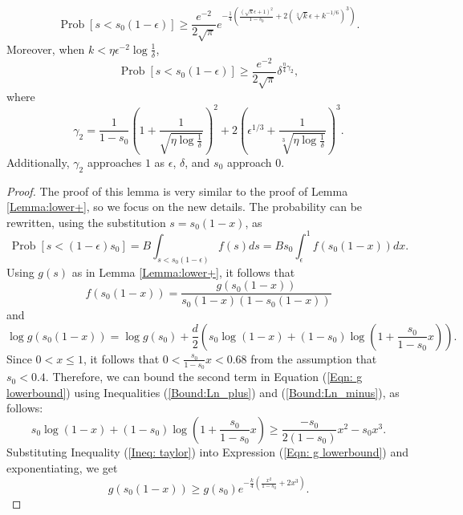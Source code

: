 \documentclass[twoside,11pt]{article}
\newcommand{\pP}[1]{\operatorname{Prob}\left[ #1 \right] }
\begin{document}
\begin{lemma} 
\[ \pP{s<s_0(1-\epsilon)} \geq \frac{e^{-2}}{2\sqrt{\pi}} e^{	- \frac{1}{4}\left(\frac{(\sqrt{k} \epsilon + 1)^2}{1-s_0} + 2(\sqrt[3]{k} \epsilon + k^{-1/6})^3\right)}.\]
Moreover, when $k<\eta\epsilon^{-2}\log\frac{1}{\delta}$,
$$
\pP{s<s_0(1-\epsilon)} \geq \frac{e^{-2}}{2\sqrt{\pi}} \delta^{\frac{\eta}{4}\gamma_2},$$
where
$$
\gamma_2=\frac{1}{1-s_0}\left(1+\frac{1}{\sqrt{\eta\log\frac{1}{\delta}}}\right)^2+2\left(\epsilon^{1/3}+\frac{1}{\sqrt[3]{\eta\log\frac{1}{\delta}}}\right)^3.
$$
Additionally, $\gamma_2$ approaches $1$ as $\epsilon$, $\delta$, and $s_0$ approach $0$.
\end{lemma}
				
\begin{proof}
The proof of this lemma is very similar to the proof of Lemma \ref{Lemma:lower+}, so we focus on the new details.  
The probability can be rewritten, using the substitution $s=s_0(1-x)$, as
					\begin{equation} \label{Eqn:minus int}
						\pP{s<(1-\epsilon)s_0} =  B\int_{s<s_0(1-\epsilon)} f(s)ds=Bs_0\int_{\epsilon}^1 f(s_0(1-x))dx.
						\end{equation}
						Using $g(s)$ as in Lemma \ref{Lemma:lower+}, it follows that
						\begin{equation}\label{Eq: f=g minus}
						f(s_0(1-x))=\frac{g(s_0(1-x))}{s_0(1-x)(1-s_0(1-x))}
						\end{equation}
						 and
						\begin{equation} \label{Eqn: g lowerbound}
							\log g(s_0(1-x)) = \log g(s_0) + \frac{d}{2}\left( s_0 \log (1-x) + (1-s_0) \log \left( 1+ \frac{s_0}{1-s_0}x \right) \right).
						\end{equation}
					Since $0< x\leq 1$, it follows that $0<\frac{s_0}{1-s_0}x<0.68$ from the assumption that $s_0<0.4$.  Therefore, we can bound the second term in Equation (\ref{Eqn: g lowerbound}) using Inequalities (\ref{Bound:Ln_plus}) and (\ref{Bound:Ln_minus}), as follows:
					\begin{equation} 
							s_0 \log (1-x) +  (1-s_0) \log \left( 1+ \frac{s_0}{1-s_0}x \right) 
												 \geq \frac{-s_0}{2(1-s_0)}x^2 -s_0x^3. \label{Ineq: taylor}
						\end{equation}
											Substituting Inequality (\ref{Ineq: taylor}) into Expression (\ref{Eqn: g lowerbound}) and exponentiating, we get
						\begin{equation} \label{Ineq: g_lower}
							g(s_0(1-x)) \geq g(s_0)e^{ - \frac{k}{4}\left(\frac{x^2}{1-s_0} + 2x^3 \right)}.

\end{equation}
\end{proof}
\end{document}
